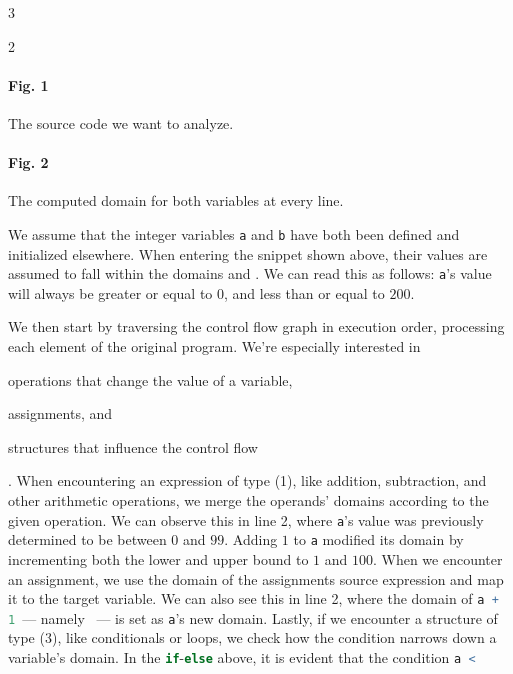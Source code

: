 \documentclass[color,coloraccent=red!60!black,listings]{poster}
\def\rc#1{\lstinline[language=r]{#1}}
\begin{document}
\begin{multicols}{3}
\begin{minipage}{\dimexpr2\columnwidth+\columnsep\relax}
\begin{multicols}{2}
			\paragraph{Fig. 1} The source code we want to analyze.\par\columnbreak
			\par
			\paragraph{Fig. 2} The computed domain for both variables at every line.
		\end{multicols}\medskip
		We assume that the integer variables \rc{a} and \rc{b} have both been defined
		and initialized elsewhere. When entering the snippet shown above, their values
		are assumed to fall within the domains  and . We
		can read this as follows: \rc{a}'s value will always be greater or equal to $0$,
		and less than or equal to $200$.\par
		We then start by traversing the control flow graph in execution order,
		processing each element of the original program. We're especially interested in
		\begin{enumerate*}
			\item operations that change the value of a variable,
			\item assignments, and
			\item structures that influence the control flow
		\end{enumerate*}. When encountering an expression of type (1), like addition,
		subtraction, and other arithmetic operations, we merge the operands' domains
		according to the given operation. We can observe this in line 2, where \rc{a}'s
		value was previously determined to be between $0$ and $99$. Adding $1$ to \rc{a}
		modified its domain by incrementing both the lower and upper bound to $1$ and
		$100$. When we encounter an assignment, we use the domain of the assignments
		source expression and map it to the target variable. We can also see this in
		line 2, where the domain of \rc{a + 1}~--- namely ~--- is set as
		\rc{a}'s new domain. Lastly, if we encounter a structure of type (3), like
		conditionals or loops, we check how the condition narrows down a variable's
		domain. In the \rc{if}-\rc{else} above, it is evident that the condition \rc{a <
}
\end{minipage}
\end{multicols}
\end{document}
